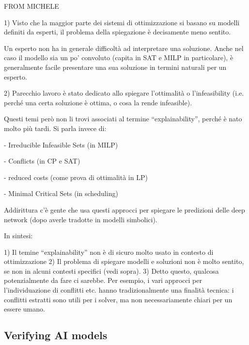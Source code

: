 \begin{description}
    {\color{red}FROM MICHELE \tt

      1) Visto che la maggior parte dei sistemi di ottimizzazione si
      basano su modelli definiti da esperti, il problema della
      spiegazione è decisamente meno sentito.

      Un esperto non ha in generale difficoltà ad interpretare una
      soluzione. Anche nel caso il modello sia un po’ convoluto
      (capita in SAT e MILP in particolare), è generalmente facile
      presentare una sua soluzione in termini naturali per un esperto.

      2) Parecchio lavoro è stato dedicato allo spiegare l’ottimalità
      o l’infeasibility (i.e. perché una certa soluzione è ottima, o
      cosa la rende infeasible).

      Questi temi però non li trovi associati al termine
      “explainability”, perché è nato molto più tardi. Si parla invece
      di:

      - Irreducible Infeasible Sets (in MILP)
      
      - Conflicts (in CP e SAT)
      
      - reduced costs (come  prova di ottimalità in LP)
      
      - Minimal Critical Sets (in scheduling)
      

      Addirittura c’è gente che usa questi approcci per spiegare le
      predizioni delle deep network (dopo averle tradotte in modelli
      simbolici).

In sintesi:

1) Il temine “explainability” non è di sicuro molto usato in contesto di ottimizzazione
2) Il problema di  spiegare modelli e soluzioni non è molto sentito, se non in alcuni contesti specifici (vedi sopra).
3) Detto questo, qualcosa potenzialmente da fare ci sarebbe. Per esempio, i vari approcci per l’individuazione di conflitti etc. hanno tradizionalmente una finalità tecnica: i  conflitti estratti sono utili per i solver, ma non necessariamente chiari per un  essere umano.
    }
  \end{description}
  
\subsection{Verifying AI models}

  

